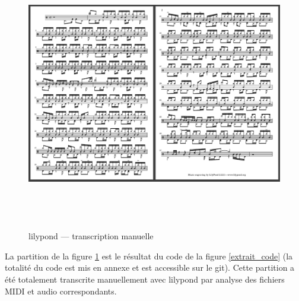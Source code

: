 \begin{figure}[h]
    \includegraphics[height=120mm, width=160mm]{
    z_images/4_experimentations/1_analyses/3_partition.png}
    \caption{lilypond — transcription manuelle}
	\label{partition_ref}
\end{figure}

La partition de la figure \ref{partition_ref} est le résultat du code de la
figure \ref{extrait_code} (la totalité du code est mis en annexe et est
accessible sur le git). Cette partition a été totalement transcrite
manuellement avec lilypond par analyse des fichiers MIDI et audio
correspondants.

